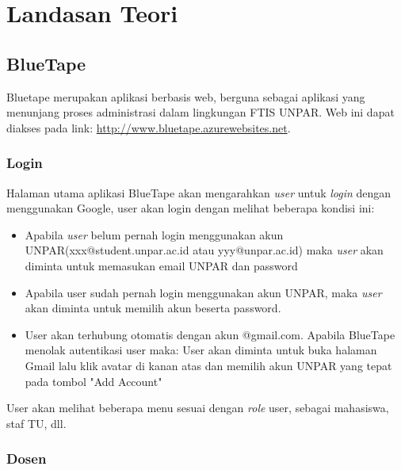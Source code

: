 \chapter{Landasan Teori}

\section{BlueTape}
Bluetape merupakan aplikasi berbasis web, berguna sebagai aplikasi yang menunjang proses administrasi dalam lingkungan FTIS UNPAR. Web ini dapat diakses pada link: \url{http://www.bluetape.azurewebsites.net}. \cite{blueTape}

\subsection{Login}
\label{ss:login}
Halaman utama aplikasi BlueTape akan mengarahkan \textit{user} untuk \textit{login} dengan menggunakan Google, user akan login dengan melihat beberapa kondisi ini:
\begin{itemize}
	\item Apabila \textit{user} belum pernah login menggunakan akun UNPAR(xxx@student.unpar.ac.id atau yyy@unpar.ac.id) maka  \textit{user} akan diminta untuk memasukan email UNPAR dan password
	\item Apabila user sudah pernah login menggunakan akun UNPAR, maka \textit{user} akan diminta untuk memilih akun beserta password.
	\item User akan terhubung otomatis dengan akun @gmail.com. Apabila BlueTape menolak autentikasi user maka: User akan diminta untuk buka halaman Gmail lalu klik avatar di kanan atas dan memilih akun UNPAR yang tepat pada tombol "Add Account"
\end{itemize}
User akan melihat beberapa menu sesuai dengan \textit{role} user, sebagai mahasiswa, staf TU, dll.

\subsection{Dosen} 
